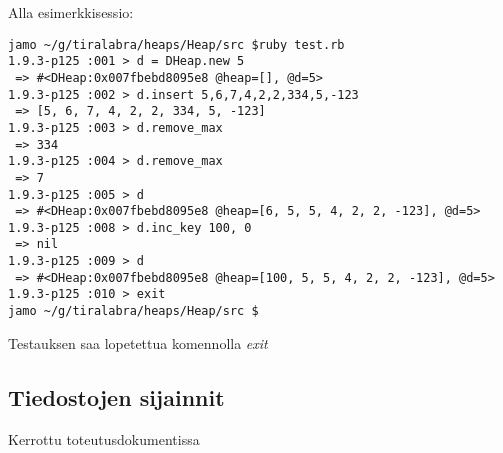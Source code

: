 \documentclass[a4paper,12pt]{article}
\begin{document}
Alla esimerkkisessio:
\begin{verbatim}
jamo ~/g/tiralabra/heaps/Heap/src $ruby test.rb 
1.9.3-p125 :001 > d = DHeap.new 5
 => #<DHeap:0x007fbebd8095e8 @heap=[], @d=5> 
1.9.3-p125 :002 > d.insert 5,6,7,4,2,2,334,5,-123
 => [5, 6, 7, 4, 2, 2, 334, 5, -123] 
1.9.3-p125 :003 > d.remove_max
 => 334 
1.9.3-p125 :004 > d.remove_max
 => 7 
1.9.3-p125 :005 > d
 => #<DHeap:0x007fbebd8095e8 @heap=[6, 5, 5, 4, 2, 2, -123], @d=5> 
1.9.3-p125 :008 > d.inc_key 100, 0
 => nil 
1.9.3-p125 :009 > d
 => #<DHeap:0x007fbebd8095e8 @heap=[100, 5, 5, 4, 2, 2, -123], @d=5> 
1.9.3-p125 :010 > exit
jamo ~/g/tiralabra/heaps/Heap/src $
\end{verbatim}
Testauksen saa lopetettua komennolla \emph{exit}

\subsection{Tiedostojen sijainnit}
Kerrottu toteutusdokumentissa
\end{document}
